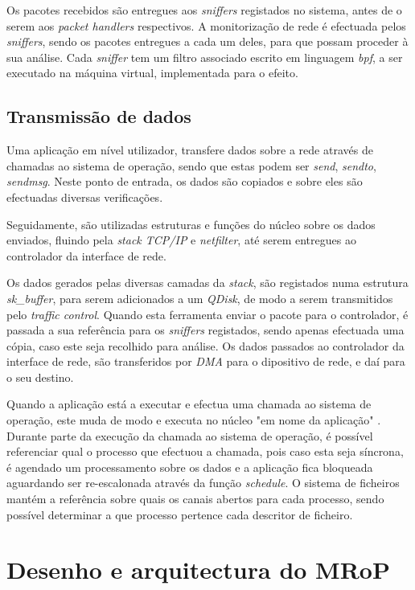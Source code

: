 Os pacotes recebidos são entregues aos \textit{sniffers} registados no sistema, antes de o serem aos \textit{packet handlers} respectivos.
A monitorização de rede é efectuada pelos \textit{sniffers}, sendo os pacotes entregues a cada um deles, para que possam proceder à sua análise.
Cada \textit{sniffer} tem um filtro associado escrito em linguagem \textit{bpf}, a ser executado na máquina virtual, implementada para o efeito.

\subsection{Transmissão de dados}

Uma aplicação em nível utilizador, transfere dados sobre a rede através de chamadas ao sistema de operação, sendo que estas podem ser \textit{send}, \textit{sendto}, \textit{sendmsg}.
Neste ponto de entrada, os dados são copiados e sobre eles são efectuadas diversas verificações.

Seguidamente, são utilizadas estruturas e funções do núcleo sobre os dados enviados, fluindo pela \textit{stack TCP/IP} e \textit{netfilter}, até serem entregues ao controlador da interface de rede.

Os dados gerados pelas diversas camadas da \textit{stack}, são registados numa estrutura \textit{sk\_buffer}, para serem adicionados a um \textit{QDisk}, de modo a serem transmitidos pelo \textit{traffic control}.
Quando esta ferramenta enviar o pacote para o controlador, é passada a sua referência para os \textit{sniffers} registados, sendo apenas efectuada uma cópia, caso este seja recolhido para análise.
Os dados passados ao controlador da interface de rede, são transferidos por \textit{DMA} para o dipositivo de rede, e daí para o seu destino.

Quando a aplicação está a executar e efectua uma chamada ao sistema de operação, este muda de modo e executa no núcleo \color{red} "em nome da aplicação" \color{black}.
Durante parte da execução da chamada ao sistema de operação, é possível referenciar qual o processo que efectuou a chamada, pois caso esta seja síncrona, é agendado um processamento sobre os dados e a aplicação fica bloqueada aguardando ser re-escalonada através da função \textit{schedule}.
O sistema de ficheiros mantém a referência sobre quais os canais abertos para cada processo, sendo possível determinar a que processo pertence cada descritor de ficheiro. 

\section{Desenho e arquitectura do MRoP}
\label{sec:mrop_architecture}

